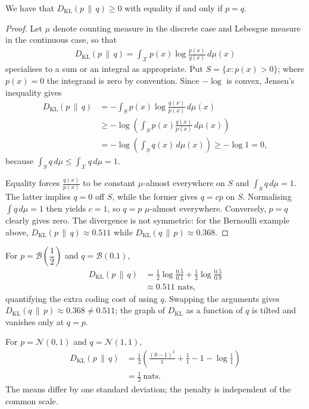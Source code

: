 \documentclass[a4paper, 12pt]{book}
\begin{document}
\begin{lemma}
    We have that $D_{\mathrm{KL}}(p\,\|\,q) \geq 0$ with equality if and only if $p=q$.
\end{lemma}
\begin{proof}
    Let $\mu$ denote counting measure in the discrete case and Lebesgue measure in the continuous case, so that
    \begin{align}
        D_{\mathrm{KL}}(p\,\|\,q) = \int_{\mathcal{X}} p(x)\log\frac{p(x)}{q(x)}\,d\mu(x)
    \end{align}
    specialises to a sum or an integral as appropriate. Put $S=\{x:p(x)>0\}$; where $p(x)=0$ the integrand is zero by convention. Since $-\log$ is convex, Jensen's inequality gives
    \begin{align}
        D_{\mathrm{KL}}(p\,\|\,q)
        &= -\int_S p(x)\log\frac{q(x)}{p(x)}\,d\mu(x) \\
        &\geq -\log\!\left(\int_S p(x)\frac{q(x)}{p(x)}\,d\mu(x)\right) \\
        &= -\log\!\left(\int_S q(x)\,d\mu(x)\right)
        \geq -\log 1 = 0,
    \end{align}
    because $\int_S q\,d\mu\leq\int_{\mathcal{X}} q\,d\mu=1$.

    Equality forces $\frac{q(x)}{p(x)}$ to be constant $\mu$-almost everywhere on $S$ and $\int_S q\,d\mu=1$. The latter implies $q=0$ off $S$, while the former gives $q=cp$ on $S$. Normalising $\int q\,d\mu=1$ then yields $c=1$, so $q=p$ $\mu$-almost everywhere. Conversely, $p=q$ clearly gives zero. The divergence is not symmetric: for the Bernoulli example above, $D_{\mathrm{KL}}(p\,\|\,q)\approx0.511$ while $D_{\mathrm{KL}}(q\,\|\,p)\approx0.368$.
\end{proof}

\begin{example}
    For $p=\mathscr{B}\left(\dfrac{1}{2}\right)$ and $q=\mathscr{B}(0.1)$, 
    \begin{align}
        D_{\mathrm{KL}}(p\,\|\,q) &= \tfrac12\log\tfrac{0.5}{0.1}+\tfrac12\log\tfrac{0.5}{0.9} \\
        &\approx 0.511\text{ nats},
    \end{align}
    quantifying the extra coding cost of using $q$.     Swapping the arguments gives $D_{\mathrm{KL}}(q\,\|\,p)\approx0.368\neq0.511$; the graph of $D_{\mathrm{KL}}$ as a function of $q$ is tilted and vanishes only at $q=p$.
\end{example}

\begin{example}
    For $p=\mathscr{N}(0,1)$ and $q=\mathscr{N}(1,1)$,
    \begin{align}
        D_{\mathrm{KL}}(p\,\|\,q) &= \frac12\left(\frac{(0-1)^2}{1}+\frac{1}{1}-1-\log\frac{1}{1}\right) \\
        &= \frac12~\text{nats}.
    \end{align}
    The means differ by one standard deviation; the penalty is independent of the common scale.
\end{example}
\end{document}
